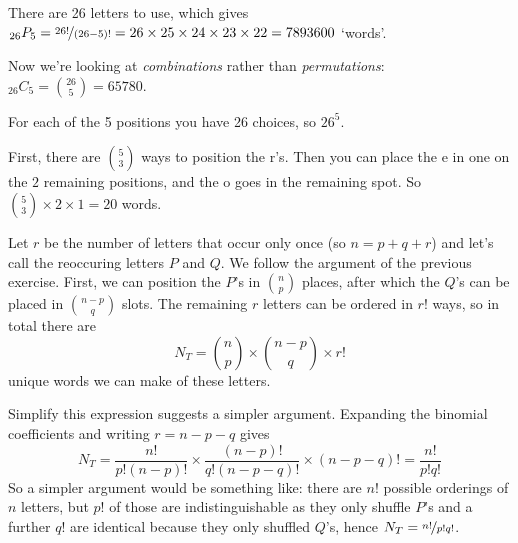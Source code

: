 \documentclass[a4paper,10pt,landscape,twocolumn]{scrartcl}
\begin{document}
\begin{exercise}[Words]
	\begin{subex}
    There are 26 letters to use, which gives ${}_{26}P_{5} = \nicefrac{26!}{(26-5)!} = 26 \times 25 \times 24 \times 23 \times 22 = 7893600$ `words'.
	\end{subex}
	
	\begin{subex}
    Now we're looking at \emph{combinations} rather than \emph{permutations}: ${}_{26}C_{5} = {26 \choose 5} = 65780$.
	\end{subex}
	
	\begin{subex}
    For each of the 5 positions you have 26 choices, so $26^5$.
	\end{subex}

	\begin{subex}
    First, there are ${5 \choose 3}$ ways to position the r's. Then you can place the e in one on the $2$ remaining positions, and the o goes in the remaining spot. So ${5 \choose 3} \times 2  \times 1 = 20$ words. 
	\end{subex}

	\begin{subex}
    Let $r$ be the number of letters that occur only once (so $n = p + q + r$) and let's call the reoccuring letters $P$ and $Q$.
    We follow the argument of the previous exercise.
    First, we can position the $P$'s in ${n \choose p}$ places, after which the ${Q}$'s can be placed in ${{n-p} \choose q}$ slots. The remaining $r$ letters can be ordered in $r!$ ways, so in total there are 
    \[
      N_T = {n \choose p} \times {{n-p} \choose q} \times r!
    \]
    unique words we can make of these letters.
    
    Simplify this expression suggests a simpler argument. Expanding the binomial coefficients and writing $r = n - p - q$ gives
    \[
      N_T = \frac{n!}{p!(n-p)!} \times \frac{(n-p)!}{q!(n-p-q)!} \times (n-p-q)!
        = \frac{n!}{p!q!}
    \]
    So a simpler argument would be something like: there are $n!$ possible orderings of $n$ letters, but $p!$ of those are indistinguishable as they only shuffle $P$'s and a further $q!$ are identical because they only shuffled $Q$'s, hence $N_T = \nicefrac{n!}{p!q!}$. 
	\end{subex}
\end{exercise}
\end{document}
